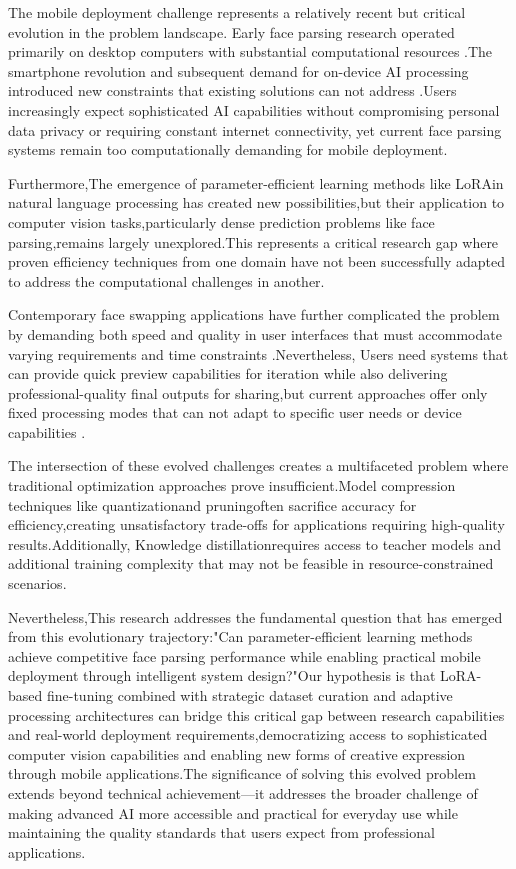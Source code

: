 \documentclass[12pt,a4paper]{report}
\begin{document}
The mobile deployment challenge represents a relatively recent but critical evolution in the problem landscape. Early face parsing research operated primarily on desktop computers with substantial computational resources \cite{smith2013face}.The smartphone revolution and subsequent demand for on-device AI processing introduced new constraints that existing solutions can not address \cite{howard2017mobilenets}.Users increasingly expect sophisticated AI capabilities without compromising personal data privacy or requiring constant internet connectivity, yet current face parsing systems remain too computationally demanding for mobile deployment\cite{chen2022mobile}.

Furthermore,The emergence of parameter-efficient learning methods like LoRA\cite{hu2021lora}in natural language processing has created new possibilities,but their application to computer vision tasks,particularly dense prediction problems like face parsing,remains largely unexplored\cite{sung2022lst}.This represents a critical research gap where proven efficiency techniques from one domain have not been successfully adapted to address the computational challenges in another.

Contemporary face swapping applications have further complicated the problem by demanding both speed and quality in user interfaces that must accommodate varying requirements and time constraints\cite{nirkin2019fsgan} .Nevertheless, Users need systems that can provide quick preview capabilities for iteration while also delivering professional-quality final outputs for sharing,but current approaches offer only fixed processing modes that can not adapt to specific user needs or device capabilities \cite{zhu2021one}.

The intersection of these evolved challenges creates a multifaceted problem where traditional optimization approaches prove insufficient.Model compression techniques like quantization\cite{jacob2018quantization}and pruning\cite{louizos2018learning}often sacrifice accuracy for efficiency,creating unsatisfactory trade-offs for applications requiring high-quality results.Additionally, Knowledge distillation\cite{hinton2015distilling}requires access to teacher models and additional training complexity that may not be feasible in resource-constrained scenarios.

Nevertheless,This research addresses the fundamental question that has emerged from this evolutionary trajectory:"Can parameter-efficient learning methods achieve competitive face parsing performance while enabling practical mobile deployment through intelligent system design?"Our hypothesis is that LoRA-based fine-tuning combined with strategic dataset curation and adaptive processing architectures can bridge this critical gap between research capabilities and real-world deployment requirements,democratizing access to sophisticated computer vision capabilities and enabling new forms of creative expression through mobile applications.The significance of solving this evolved problem extends beyond technical achievement—it addresses the broader challenge of making advanced AI more accessible and practical for everyday use while maintaining the quality standards that users expect from professional applications.
\end{document}
